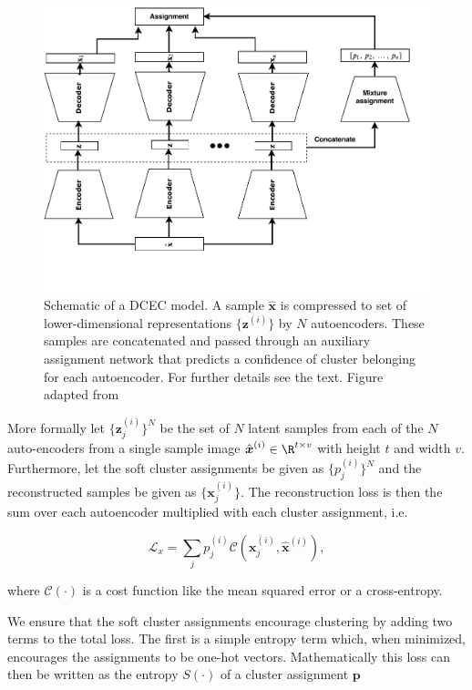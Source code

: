 \begin{figure}[tb]
	\centering
	\includegraphics[width=\textwidth]{plots/mixae.pdf}
	\caption[Deep convolutional embedded clustering schematic]{Schematic of a DCEC model. A sample $\hat{\boldsymbol{x}}$ is compressed to set of lower-dimensional representations $\{\boldsymbol{z}^{(i)}\}$ by $N$ autoencoders. These samples are concatenated and passed through an auxiliary assignment network that predicts a confidence of cluster belonging for each autoencoder. For further details see the text. Figure adapted from \citet{Zhang}}
	\label{fig:mixae}
\end{figure}


More formally let $\{\boldsymbol{z}_j^{(i)}\}^N$ be the set of $N$ latent samples from each of the $N$ auto-encoders from a single sample image $\hat{\boldsymbol{x}}^{(i)} \in \R ^{t\times v}$ with height $t$ and width $v$. Furthermore, let the soft cluster assignments be given as $\{p_j^{(i)}\}^N$ and the reconstructed samples be given as $\{\boldsymbol{x}_j^{(i)}\}$. The reconstruction loss is then the sum over each autoencoder multiplied with each cluster assignment, i.e.

\begin{equation}\label{eq:mixae_reconst}
\mathcal{L}_x = \sum_j p_j^{(i)} \mathcal{C}(\boldsymbol{x}_j^{(i)}, \hat{\boldsymbol{x}}^{(i)}),
\end{equation}

\noindent where $\mathcal{C}(\cdot)$ is a cost function like the mean squared error or a cross-entropy.

We ensure that the soft cluster assignments encourage clustering by adding two terms to the total loss. The first is a simple entropy term which, when minimized, encourages the assignments to be one-hot vectors. Mathematically this loss can then be written as the entropy $S(\cdot)$ of a cluster assignment $\boldsymbol{p}$

